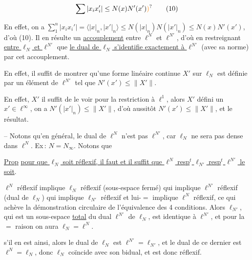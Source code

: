 \[
\sum|x_i x_i'|\leq N(x)N'(x')\unsure{)}\tag*{(10)}
\]

En effet, on a $\sum_{1}^{n}|x_i x_i'|=\langle |x|_n,|x'|_n\rangle\leq N(|x|_n)N(|x'|_n)\leq N(x)N'(x')$\unsure{)}, d'où (10). Il en résulte un \uline{accouplement} entre $\ell^N$ et $\ell^{N'}$,  d'où en restreignant \uline{entre $\ell_N$ et $\ell^{N'}$}\unsure{;|,}   que \uline{le dual de $\ell_N$ s'identifie exactement à $\ell^{N'}$} (avec sa norme) par cet accouplement.

En effet,  il suffit de montrer qu'une forme linéaire continue $X'$ sur $\ell_N$ est définie par un  élément de $\ell^{N'}$  tel que $N'(x')\leq\lVert X'\rVert$.

En effet, $X'$  il suffit de le voir pour la  restriction à $\ell^1$, alors $X'$  défini   un $x'\in\ell^\infty$,  on a $N'(|x'|_n)\leq\lVert X'\rVert$, d'où aussitôt $N'(x')\leq\lVert X'\rVert$, et le résultat.

-- Notons qu'en général, le dual de $\ell^N$ n'est pas $\ell^{N'}$,  car $\ell_N$ ne sera pas dense dans $\ell^N$. Ex\,: $N=N_\infty$. Notons que

\uline{Prop} \uline{pour que $\ell_N$ soit réflexif, il faut et il suffit que $\ell^N$ resp$^t$ $\ell_{N'}$ resp$^t$ $\ell^{N'}$ le soit}.  

$\ell^N$ réflexif implique $\ell_N$ réflexif (sous-espace fermé) qui implique $\ell^{N'}$ réflexif (dual de $\ell_N$) qui  implique $\ell_{N'}$ réflexif et lui-$=$ implique $\ell^N$ réflexif, ce qui achève la démonstration  circulaire de l'équivalence des 4 conditions. Alors $\ell_{N'}$, qui est un sous-espace  \uline{total}  du dual $\ell^{N'}$ de $\ell_N$, est identique à $\ell^{N'}$, et pour la $=$ raison on aura $\ell_N=\ell^N$.


 s'il en est ainsi, alors le dual de $\ell_N$ est $\ell^{N'}=\ell_{N'}$, et le dual de ce dernier est $\ell^N=\ell_N$, donc $\ell_N$ coïncide avec son bidual, et est donc réflexif.

